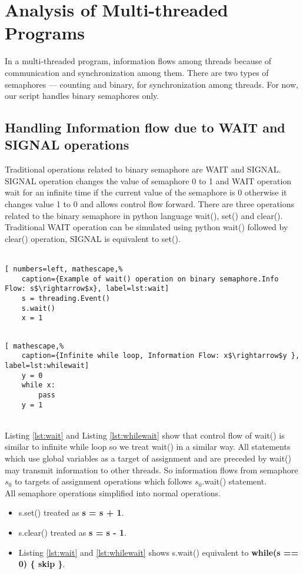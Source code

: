 \chapter{Analysis of Multi-threaded Programs}
\label{ch:thread}
In a multi-threaded program, information flows among threads because of communication and synchronization among them. There are two types of semaphores --- counting and binary, for synchronization among threads. For now, our script handles binary semaphores only. 
\section{Handling Information flow due to WAIT and SIGNAL operations}
Traditional operations related to binary semaphore are WAIT and SIGNAL. SIGNAL operation changes the value of semaphore 0 to 1 and WAIT operation wait for an infinite time if the current value of the semaphore is 0 otherwise it changes value 1 to 0 and allows control flow forward. There are three operations related to the binary semaphore in python language wait(), set() and clear(). Traditional WAIT operation can be simulated using python wait() followed by clear() operation, SIGNAL is equivalent to set().\\~\\
\begin{minipage}[b]{0.45\linewidth}
	\centering
	\begin{lstlisting}[ numbers=left, mathescape,%
	caption={Example of wait() operation on binary semaphore.Info Flow: s$\rightarrow$x}, label=lst:wait]
	s = threading.Event()
	s.wait()
	x = 1
	
	\end{lstlisting}
\end{minipage}
\hspace{0.5cm}
\begin{minipage}[b]{0.45\linewidth}
	\centering
	\begin{lstlisting}[ mathescape,%
	caption={Infinite while loop, Information Flow: x$\rightarrow$y }, label=lst:whilewait]
	y = 0
	while x:
		pass
	y = 1
	\end{lstlisting}
\end{minipage}\\
Listing \ref{lst:wait} and Listing \ref{lst:whilewait} show that control flow of wait()  is similar to infinite while loop so we treat wait() in a similar way. All statements which use global variables as a target of assignment and are preceded by wait() may transmit information to other threads. So information flows from semaphore $s_0$ to targets of assignment operations which follows $s_0$.wait() statement.\\
All semaphore operations simplified into normal operations.
\begin{itemize}
	\item s.set() treated as \textbf{s = s + 1}.
	\item s.clear() treated as \textbf{s = s - 1}.
	\item Listing \ref{lst:wait} and \ref{lst:whilewait} shows s.wait() equivalent to \textbf{while(s == 0) \{ skip \}}.
\end{itemize}
